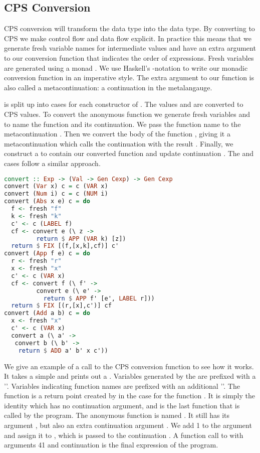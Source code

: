 {\subsection{\label{subsection:cpsconvert}CPS Conversion}
\ac{CPS} conversion will transform the  data type into the  data type. By converting to \ac{CPS} we make control flow and data flow explicit. In practice this means that we generate fresh variable names for intermediate values and have an extra argument to our conversion function that indicates the order of expressions. Fresh variables are generated using a monad \autocite{DBLP:conf/lics/Moggi89}. We use Haskell's -notation to write our monadic conversion function in an imperative style. The extra argument to our function is also called a metacontinuation: a continuation in the metalangauge.

 is split up into cases for each constructor of . The values  and  are converted to \ac{CPS} values. To convert the anonymous 
function  we generate fresh variables  and  to name the function and its continuation. We pass the function name to the metacontinuation . Then we convert the body of the function , giving it a metacontinuation which calls the continuation with the result . Finally, we construct a  to contain our converted function and update continuation . The  and  cases follow a similar approach.

\begin{lstlisting}[language=Haskell]
convert :: Exp -> (Val -> Gen Cexp) -> Gen Cexp
convert (Var x) c = c (VAR x)
convert (Num i) c = c (NUM i)
convert (Abs x e) c = do
  f <- fresh "f"
  k <- fresh "k"
  c' <- c (LABEL f)
  cf <- convert e (\ z ->
         return $ APP (VAR k) [z])
  return $ FIX [(f,[x,k],cf)] c'
convert (App f e) c = do
  r <- fresh "r"
  x <- fresh "x"
  c' <- c (VAR x)
  cf <- convert f (\ f' ->
         convert e (\ e' ->
           return $ APP f' [e', LABEL r]))
  return $ FIX [(r,[x],c')] cf
convert (Add a b) c = do
  x <- fresh "x"
  c' <- c (VAR x)
  convert a (\ a' ->
   convert b (\ b' ->
    return $ ADD a' b' x c'))
\end{lstlisting}

We give an example of a call to the \ac{CPS} conversion function to see how it works. It takes a simple  and prints out a . Variables generated by the  are prefixed with a ''. Variables indicating function names are prefixed with an additional '\icode{_}'. The function  is a return point created by  in the  case for the function . It is simply the identity which has no continuation argument, and is the last function that is called by the program. The anonymous function is named . It still has its argument , but also an extra continuation argument . We add 1 to the argument  and assign it to , which is passed to the continuation . A function call to  with arguments 41 and continuation  is the final expression of the program.

}
